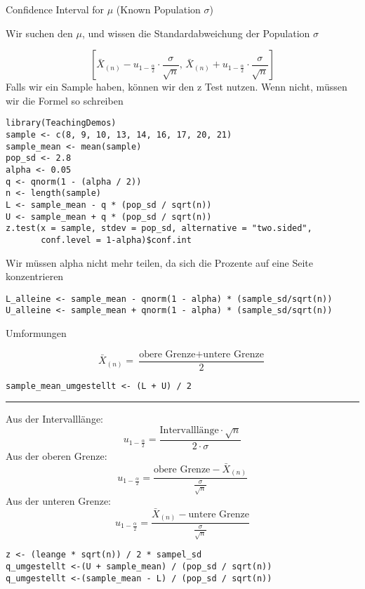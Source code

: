 \begin{multicols*}{2}

\begin{center}
     \Large{Confidence Interval for $\mu$ (Known Population $\sigma$)}
\end{center}
\begin{center}
     \Large{Wir suchen den $\mu$, und wissen die Standardabweichung der Population $\sigma$}
\end{center}

$$
\left[ \bar{X}_{(n)} - u_{1 - \frac{\alpha}{2}} \cdot \frac{\sigma}{\sqrt{n}}, \, \bar{X}_{(n)} + u_{1 - \frac{\alpha}{2}} \cdot \frac{\sigma}{\sqrt{n}} \right]
$$
Falls wir ein Sample haben, können wir den z Test nutzen. Wenn nicht, müssen wir die Formel so schreiben
\begin{lstlisting}
library(TeachingDemos)
sample <- c(8, 9, 10, 13, 14, 16, 17, 20, 21)
sample_mean <- mean(sample)
pop_sd <- 2.8
alpha <- 0.05
q <- qnorm(1 - (alpha / 2))
n <- length(sample)
L <- sample_mean - q * (pop_sd / sqrt(n))
U <- sample_mean + q * (pop_sd / sqrt(n))
z.test(x = sample, stdev = pop_sd, alternative = "two.sided",
       conf.level = 1-alpha)$conf.int
\end{lstlisting}

Wir müssen alpha nicht mehr teilen, da sich die Prozente auf eine Seite konzentrieren
\begin{lstlisting}
L_alleine <- sample_mean - qnorm(1 - alpha) * (sample_sd/sqrt(n))
U_alleine <- sample_mean + qnorm(1 - alpha) * (sample_sd/sqrt(n))
\end{lstlisting}
\begin{center}
     \Large{Umformungen}
\end{center}
$$
\bar{X}_{(n)} = \frac{\text{obere Grenze} + \text{untere Grenze}}{2}
$$
\begin{lstlisting}
sample_mean_umgestellt <- (L + U) / 2
\end{lstlisting}

\hrule
{}
Aus der Intervalllänge:
$$u_{1 - \frac{\alpha}{2}} = \frac{\text{Intervalllänge} \cdot \sqrt{n}}{2 \cdot \sigma}$$
 Aus der oberen Grenze:
$$
u_{1 - \frac{\alpha}{2}} = \frac{\text{obere Grenze} - \bar{X}_{(n)}}{\frac{\sigma}{\sqrt{n}}}
$$
Aus der unteren Grenze:
$$
u_{1 - \frac{\alpha}{2}} = \frac{\bar{X}_{(n)} - \text{untere Grenze}}{\frac{\sigma}{\sqrt{n}}}
$$
\begin{lstlisting}
z <- (leange * sqrt(n)) / 2 * sampel_sd
q_umgestellt <-(U + sample_mean) / (pop_sd / sqrt(n))
q_umgestellt <-(sample_mean - L) / (pop_sd / sqrt(n))
\end{lstlisting}
\columnbreak
{}


\end{multicols*}
